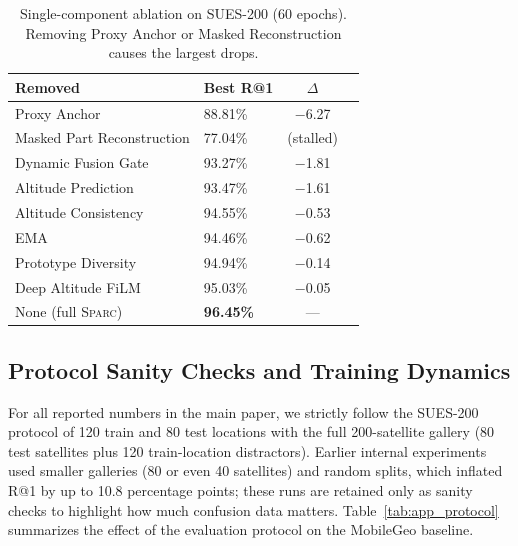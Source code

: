 \documentclass[sigconf, anonymous, review]{acmart}
\newcommand{\ours}{\textsc{Sparc}}
\begin{document}
\begin{table}[h]
\caption{Single-component ablation on SUES-200 (60 epochs). Removing Proxy Anchor or Masked Reconstruction causes the largest drops.}
\label{tab:app_ablation}
\centering
\small
\begin{tabular}{@{}llcc@{}}
\toprule
\textbf{Removed} & \textbf{Best R@1} & \textbf{$\Delta$} \\
\midrule
Proxy Anchor & 88.81\% & $-$6.27 \\
Masked Part Reconstruction & 77.04\% & (stalled) \\
Dynamic Fusion Gate & 93.27\% & $-$1.81 \\
Altitude Prediction & 93.47\% & $-$1.61 \\
Altitude Consistency & 94.55\% & $-$0.53 \\
EMA & 94.46\% & $-$0.62 \\
Prototype Diversity & 94.94\% & $-$0.14 \\
Deep Altitude FiLM & 95.03\% & $-$0.05 \\
\midrule
\rowcolor{bestrow}
None (full \ours{}) & \textbf{96.45\%} & --- \\
\bottomrule
\end{tabular}
\end{table}

\subsection*{Protocol Sanity Checks and Training Dynamics}

For all reported numbers in the main paper, we strictly follow the SUES-200 protocol of 120 train and 80 test locations with the full 200-satellite gallery (80 test satellites plus 120 train-location distractors).
Earlier internal experiments used smaller galleries (80 or even 40 satellites) and random splits, which inflated R@1 by up to 10.8 percentage points; these runs are retained only as sanity checks to highlight how much confusion data matters.
Table~\ref{tab:app_protocol} summarizes the effect of the evaluation protocol on the MobileGeo baseline.
\end{document}
